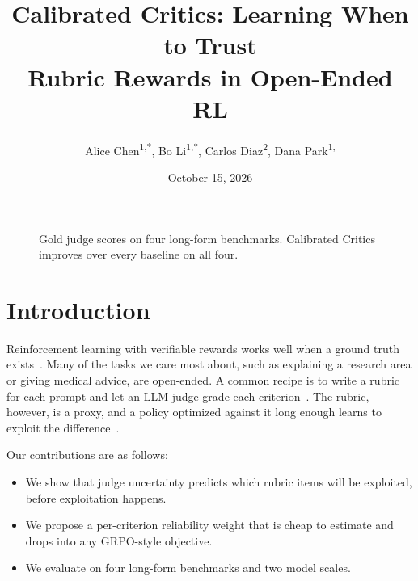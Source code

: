 \documentclass[palette=navy,titlestyle=rigorous,titlealign=center]{inkpaper}
\title{Calibrated Critics: Learning When to Trust\\Rubric Rewards in Open-Ended RL}
\author{Alice Chen\textsuperscript{1,*}, Bo Li\textsuperscript{1,*},
  Carlos Diaz\textsuperscript{2}, Dana Park\textsuperscript{1,\dag}}
\date{October 15, 2026}
\begin{document}
\maketitle

\begin{figure}[h]
\centering
{}
\caption{ Gold judge scores on four
long-form benchmarks. Calibrated Critics improves over every baseline on all
four.}
\label{fig:teaser}
\end{figure}

\section{Introduction}

Reinforcement learning with verifiable rewards works well when a ground truth
exists~\citep{shao2024deepseekmath}. Many of the tasks we care most about,
such as explaining a research area or giving medical advice, are open-ended.
A common recipe is to write a rubric for each prompt and let an LLM judge
grade each criterion~\citep{gunjal2025rubrics}. The rubric, however, is a
proxy, and a policy optimized against it long enough learns to exploit the
difference~\citep{gao2023scaling}.

Our contributions are as follows:
\begin{itemize}
  \item We show that judge uncertainty predicts which rubric items will be
    exploited, before exploitation happens.
  \item We propose a per-criterion reliability weight that is cheap to
    estimate and drops into any GRPO-style objective.
  \item We evaluate on four long-form benchmarks and two model scales.
\end{itemize}
\end{document}
